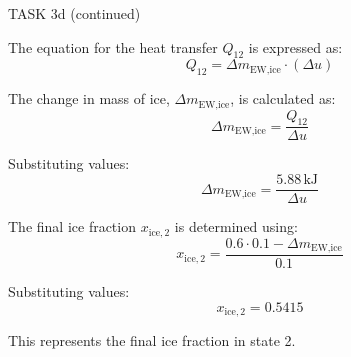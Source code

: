 TASK 3d (continued)

The equation for the heat transfer \( Q_{12} \) is expressed as:
\[
Q_{12} = \Delta m_{\text{EW,ice}} \cdot (\Delta u)
\]

The change in mass of ice, \( \Delta m_{\text{EW,ice}} \), is calculated as:
\[
\Delta m_{\text{EW,ice}} = \frac{Q_{12}}{\Delta u}
\]

Substituting values:
\[
\Delta m_{\text{EW,ice}} = \frac{5.88 \, \text{kJ}}{\Delta u}
\]

The final ice fraction \( x_{\text{ice},2} \) is determined using:
\[
x_{\text{ice},2} = \frac{0.6 \cdot 0.1 - \Delta m_{\text{EW,ice}}}{0.1}
\]

Substituting values:
\[
x_{\text{ice},2} = 0.5415
\]

This represents the final ice fraction in state 2.
